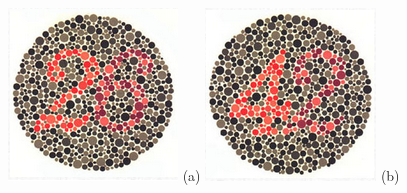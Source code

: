 \documentclass[	12pt, Times, openright, twoside, a4paper, english, brazil]{abntex2}
\begin{document}
\begin{apendicesenv}
\begin{figure}[!htb]
\centering
{\includegraphics[width=\linewidth]{ishihara-classificacao/figureIshihara22.png}}
(a)
\endminipage\hfill
{}
\centering
{\includegraphics[width=\linewidth]{ishihara-classificacao/figureIshihara23.png}}
(b)
\endminipage\hfill



\end{figure}
\end{apendicesenv}
\end{document}
